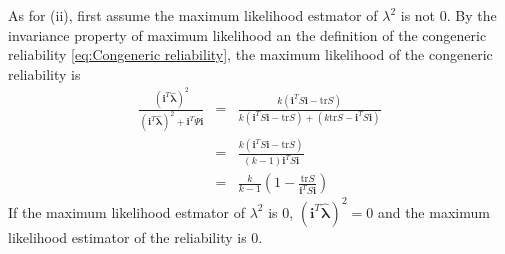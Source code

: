\documentclass{article}
\makeatletter
\theoremstyle{plain}
\theoremstyle{plain}
\theoremstyle{definition}
\theoremstyle{remark}
\theoremstyle{definition}
\theoremstyle{plain}
\theoremstyle{plain}
\theoremstyle{definition}
\newenvironment{proof}[1][\protect\proofname]{\par
	\normalfont\topsep6\p@\@plus6\p@\relax
	\trivlist
	\itemindent\parindent
	\item[\hskip\labelsep\scshape #1]\ignorespaces
}{%
	\endtrivlist\@endpefalse
}
\providecommand{\proofname}{Proof}
\makeatother
\begin{document}
\begin{proof}[Proof of Theorem \ref{thm:ML}]
As for (ii), first assume the maximum likelihood estmator of $\lambda^{2}$
is not $0$. By the invariance property of maximum likelihood an the definition of the congeneric reliability \eqref{eq:Congeneric reliability}, the maximum likelihood of the congeneric reliability is
\begin{eqnarray*}
\frac{\left(\mathbf{i}^{T}\mathbf{\widehat{\lambda}}\right)^{2}}{\left(\mathbf{i}^{T}\mathbf{\widehat{\lambda}}\right)^{2}+\mathbf{i}^{T}\Psi\mathbf{i}} & = & \frac{k\left(\mathbf{i}^{T}S\mathbf{i}-\textrm{tr}S\right)}{k\left(\mathbf{i}^{T}S\mathbf{i}-\textrm{tr}S\right)+\left(k\textrm{tr}S-\mathbf{i}^{T}S\mathbf{i}\right)}\\
 & = & \frac{k\left(\mathbf{i}^{T}S\mathbf{i}-\textrm{tr}S\right)}{\left(k-1\right)\mathbf{i}^{T}S\mathbf{i}}\\
 & = & \frac{k}{k-1}\left(1-\frac{\textrm{tr}S}{\mathbf{i}^{T}S\mathbf{i}}\right)
\end{eqnarray*}
If the maximum likelihood estmator of $\lambda^{2}$ is $0$, $\left(\mathbf{i}^{T}\mathbf{\widehat{\lambda}}\right)^{2}=0$
and the maximum likelihood estimator of the reliability is $0.$
\end{proof}
\end{document}
